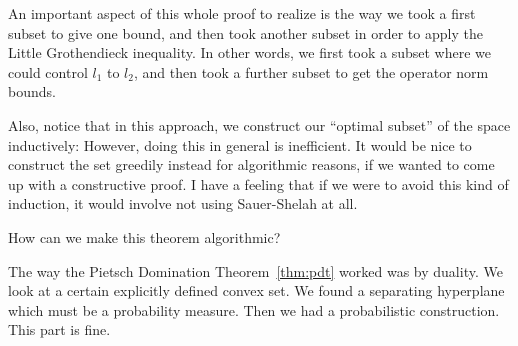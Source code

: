 An important aspect of this whole proof to realize is the way we took a first subset to give one bound, and then took another subset in order to apply the Little Grothendieck inequality. In other words, we first took a subset where we could control $l_1$ to $l_2$, and then took a further subset to get the operator norm bounds. 

Also, notice that in this approach, we construct our ``optimal subset'' of the space inductively: However, doing this in general is inefficient. It would be nice to construct the set greedily instead for algorithmic reasons, if we wanted to come up with a constructive proof. 
I have a feeling that if we were to avoid this kind of induction, it would involve not using Sauer-Shelah at all. 







How can we make this theorem algorithmic?

The way the Pietsch Domination Theorem~\ref{thm:pdt} worked was by duality. 
We look at a certain explicitly defined convex set. We found a separating hyperplane which must be a probability measure. Then we had a probabilistic construction. This part is fine.



